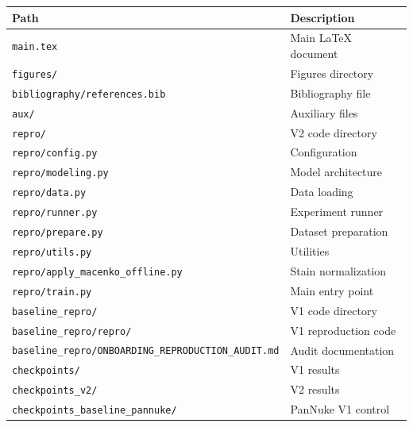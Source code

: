 \documentclass[11pt,a4paper,twoside]{report}
\newcommand{\code}[1]{\texttt{#1}}
\begin{document}
\begin{center}
\footnotesize
\begin{tabular}{l@{\quad}l}
\toprule
\textbf{Path} & \textbf{Description} \\
\midrule
\code{main.tex} & Main LaTeX document \\
\code{figures/} & Figures directory \\
\code{bibliography/references.bib} & Bibliography file \\
\code{aux/} & Auxiliary files \\
\code{repro/} & V2 code directory \\
\code{repro/config.py} & Configuration \\
\code{repro/modeling.py} & Model architecture \\
\code{repro/data.py} & Data loading \\
\code{repro/runner.py} & Experiment runner \\
\code{repro/prepare.py} & Dataset preparation \\
\code{repro/utils.py} & Utilities \\
\code{repro/apply\_macenko\_offline.py} & Stain normalization \\
\code{repro/train.py} & Main entry point \\
\code{baseline\_repro/} & V1 code directory \\
\code{baseline\_repro/repro/} & V1 reproduction code \\
\code{baseline\_repro/ONBOARDING\_REPRODUCTION\_AUDIT.md} & Audit documentation \\
\code{checkpoints/} & V1 results \\
\code{checkpoints\_v2/} & V2 results \\
\code{checkpoints\_baseline\_pannuke/} & PanNuke V1 control \\
\bottomrule
\end{tabular}
\end{center}
\end{document}
